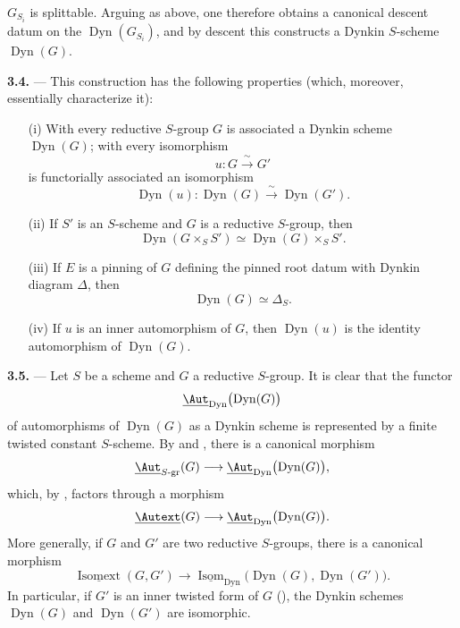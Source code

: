 \(G_{S_i}\) is splittable. Arguing as above, one therefore obtains a
canonical descent datum on the \(\operatorname{Dyn}(G_{S_i})\), and
by descent this constructs a Dynkin \(S\)-scheme
\(\operatorname{Dyn}(G)\).

\medskip\noindent\textbf{3.4.} ---
This construction has the following properties (which, moreover,
essentially characterize it):
\begin{enumerate}
\item[\SGAInlineRefTarget{sga3:xxiv:3.4:item:i}(i)] With every reductive \(S\)-group \(G\) is associated a
Dynkin scheme \(\operatorname{Dyn}(G)\); with every isomorphism
\[
  u:G\xrightarrow{\ \sim\ }G'
\]
is functorially associated an isomorphism
\[
  \operatorname{Dyn}(u):
  \operatorname{Dyn}(G)\xrightarrow{\ \sim\ }\operatorname{Dyn}(G').
\]

\item[\SGAInlineRefTarget{sga3:xxiv:3.4:item:ii}(ii)] If \(S'\) is an \(S\)-scheme and \(G\) is a reductive
\(S\)-group, then
\[
  \operatorname{Dyn}(G\times_S S')
  \simeq
  \operatorname{Dyn}(G)\times_S S'.
\]

\item[(iii)] If \(E\) is a pinning of \(G\) defining the pinned root
datum with Dynkin diagram \(\Delta\), then
\[
  \operatorname{Dyn}(G)\simeq\Delta_S.
\]

\item[\SGAInlineRefTarget{sga3:xxiv:3.4:item:iv}(iv)] If \(u\) is an inner automorphism of \(G\), then
\(\operatorname{Dyn}(u)\) is the identity automorphism of
\(\operatorname{Dyn}(G)\).
\end{enumerate}

\medskip\noindent\textbf{3.5.} ---
Let \(S\) be a scheme and \(G\) a reductive \(S\)-group. It is clear
that the functor
\[
  \underline{\Aut}_{\mathrm{Dyn}}
    \bigl(\operatorname{Dyn}(G)\bigr)
\]
of automorphisms of \(\operatorname{Dyn}(G)\) as a Dynkin scheme is
represented by a finite twisted constant \(S\)-scheme. By 
and , there is a canonical morphism
\[
  \underline{\Aut}_{S\text{-}\mathrm{gr}}(G)
  \longrightarrow
  \underline{\Aut}_{\mathrm{Dyn}}
    \bigl(\operatorname{Dyn}(G)\bigr),
\]
which, by , factors through a morphism
\[
  \underline{\Autext}(G)
  \longrightarrow
  \underline{\Aut}_{\mathrm{Dyn}}
    \bigl(\operatorname{Dyn}(G)\bigr).
\]
More generally, if \(G\) and \(G'\) are two reductive \(S\)-groups,
there is a canonical morphism
\[
  \underline{\operatorname{Isomext}}(G,G')
  \longrightarrow
  \underline{\operatorname{Isom}}_{\mathrm{Dyn}}
    \bigl(\operatorname{Dyn}(G),\operatorname{Dyn}(G')\bigr).
\]
In particular, if \(G'\) is an inner twisted form of \(G\) (),
the Dynkin schemes \(\operatorname{Dyn}(G)\) and
\(\operatorname{Dyn}(G')\) are isomorphic.

